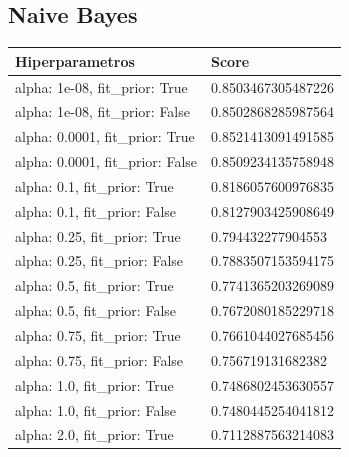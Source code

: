 \documentclass{report}
\begin{document}
{            \subsection{Naive Bayes}
                \label{tab:resultados_analisis_sentimientos} 
                    \begin{longtable}{|p{135.6px}|p{100.3px}|}
                    \hline
                    \textbf{Hiperparametros} & \textbf{Score}\\
                    \hline                    
                    alpha: 1e-08, fit\_prior: True & 0.8503467305487226 \\
                    \hline
                    alpha: 1e-08, fit\_prior: False & 0.8502868285987564 \\
                    \hline
                    alpha: 0.0001, fit\_prior: True & 0.8521413091491585 \\
                    \hline
                    alpha: 0.0001, fit\_prior: False & 0.8509234135758948 \\
                    \hline
                    alpha: 0.1, fit\_prior: True & 0.8186057600976835 \\
                    \hline
                    alpha: 0.1, fit\_prior: False & 0.8127903425908649 \\
                    \hline
                    alpha: 0.25, fit\_prior: True & 0.794432277904553 \\
                    \hline
                    alpha: 0.25, fit\_prior: False & 0.7883507153594175 \\
                    \hline
                    alpha: 0.5, fit\_prior: True & 0.7741365203269089 \\
                    \hline
                    alpha: 0.5, fit\_prior: False & 0.7672080185229718 \\
                    \hline
                    alpha: 0.75, fit\_prior: True & 0.7661044027685456 \\
                    \hline
                    alpha: 0.75, fit\_prior: False & 0.756719131682382 \\
                    \hline
                    alpha: 1.0, fit\_prior: True & 0.7486802453630557 \\
                    \hline
                    alpha: 1.0, fit\_prior: False & 0.7480445254041812 \\
                    \hline
                    alpha: 2.0, fit\_prior: True & 0.7112887563214083 \\

\end{longtable}}
\end{document}
